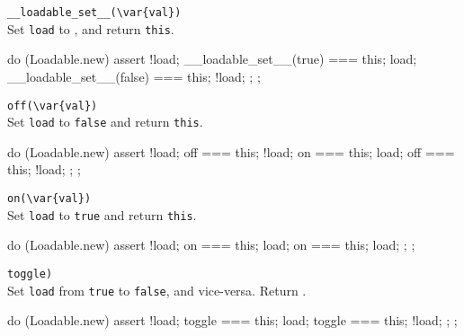 \begin{urbiscriptapi}
\item \lstinline|__loadable_set__(\var{val})|\\
  Set \lstinline|load| to , and return \lstinline|this|.
\begin{urbiassert}
do (Loadable.new)
{
  assert
  {
    !load;
    __loadable_set__(true) === this;
    load;
    __loadable_set__(false) === this;
    !load;
  };
};
\end{urbiassert}

\item \lstinline|off(\var{val})|\\
  Set \lstinline|load| to \lstinline|false| and return
  \lstinline|this|.
\begin{urbiassert}
do (Loadable.new)
{
  assert
  {
    !load;
    off === this;
    !load;
    on === this;
    load;
    off === this;
    !load;
  };
};
\end{urbiassert}

\item \lstinline|on(\var{val})|\\
  Set \lstinline|load| to \lstinline|true| and return \lstinline|this|.
\begin{urbiassert}
do (Loadable.new)
{
  assert
  {
    !load;
    on === this;
    load;
    on === this;
    load;
  };
};
\end{urbiassert}

\item \lstinline|toggle)|\\
  Set \lstinline|load| from \lstinline|true| to \lstinline|false|, and
  vice-versa.  Return .
\begin{urbiassert}
do (Loadable.new)
{
  assert
  {
    !load;
    toggle === this;
    load;
    toggle === this;
    !load;
  };
};
\end{urbiassert}
\end{urbiscriptapi}

